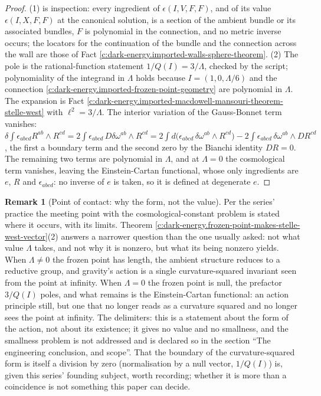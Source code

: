 \documentclass[11pt]{article}
\theoremstyle{definition}
\newtheorem{remark}[theorem]{Remark}
\theoremstyle{plain}
\newcommand{\changedmark}[2]{\marginpar{\raggedright\scriptsize\color{#1}#2}}
\begin{document}
\begin{proof}
(1) is inspection: every ingredient of $\epsilon(I, V, F, F)$, and of its value $\epsilon(I, X, F, F)$ at the canonical solution, is a section of the ambient bundle or its associated bundles, $F$ is polynomial in the connection, and no metric inverse occurs; the locators for the continuation of the bundle and the connection across the wall are those of Fact \ref{c:dark-energy.imported-walls-sphere-theorem}.
(2) The pole is the rational-function statement $1/Q(I) = 3/\Lambda$, checked by the script; polynomiality of the integrand in $\Lambda$ holds because $I = (1, 0, \Lambda/6)$ and the connection \ref{c:dark-energy.imported-frozen-point-geometry} are polynomial in $\Lambda$. The expansion is Fact \ref{c:dark-energy.imported-macdowell-mansouri-theorem-stelle-west} with $\ell^2 = 3/\Lambda$. The interior variation of the Gauss-Bonnet term vanishes: $\delta\int\epsilon_{abcd}R^{ab}\wedge R^{cd} = 2\int\epsilon_{abcd}\,D\delta\omega^{ab}\wedge R^{cd} = 2\int d\bigl(\epsilon_{abcd}\,\delta\omega^{ab}\wedge R^{cd}\bigr) - 2\int \epsilon_{abcd}\,\delta\omega^{ab}\wedge DR^{cd}$, the first a boundary term and the second zero by the Bianchi identity $DR = 0$. The remaining two terms are polynomial in $\Lambda$, and at $\Lambda = 0$ the cosmological term vanishes, leaving the Einstein-Cartan functional, whose only ingredients are $e$, $R$ and $\epsilon_{abcd}$: no inverse of $e$ is taken, so it is defined at degenerate $e$.

\end{proof}

\begin{remark}[Point of contact: why the form, not the value]\label{c:note.dark-energy.point-contact-why-form-not-value}
\changedmark{gray}{reworded}
Per the series' practice the meeting point with the cosmological-constant problem is stated where it occurs, with its limits. Theorem \ref{c:dark-energy.frozen-point-makes-stelle-west-vector}(2) answers a narrower question than the one usually asked: not what value $\Lambda$ takes, and not why it is nonzero, but what its being nonzero yields. When $\Lambda \neq 0$ the frozen point has length, the ambient structure reduces to a reductive group, and gravity's action is a single curvature-squared invariant seen from the point at infinity. When $\Lambda = 0$ the frozen point is null, the prefactor $3/Q(I)$ poles, and what remains is the Einstein-Cartan functional: an action principle still, but one that no longer reads as a curvature squared and no longer sees the point at infinity. The delimiters: this is a statement about the form of the action, not about its existence; it gives no value and no smallness, and the smallness problem is not addressed and is declared so in the section ``The engineering conclusion, and scope''. That the boundary of the curvature-squared form is itself a division by zero (normalisation by a null vector, $1/Q(I)$) is, given this series' founding subject, worth recording; whether it is more than a coincidence is not something this paper can decide.
\end{remark}
\end{document}
